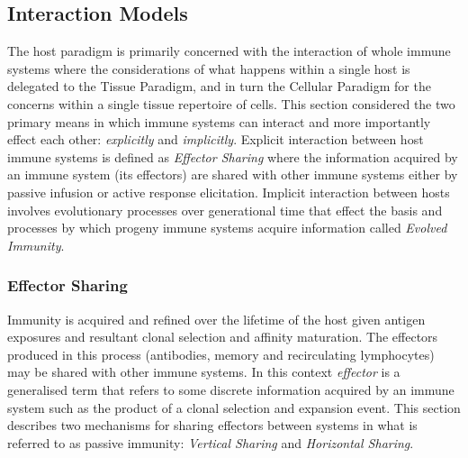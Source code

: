 \subsection{Interaction Models}
\label{sec:hosts:paradigm:interaction}
The host paradigm is primarily concerned with the interaction of whole immune systems where the considerations of what happens within a single host is delegated to the Tissue Paradigm, and in turn the Cellular Paradigm for the concerns within a single tissue repertoire of cells. This section considered the two primary means in which immune systems can interact and more importantly effect each other: \emph{explicitly} and \emph{implicitly}. Explicit interaction between host immune systems is defined as \emph{Effector Sharing} where the information acquired by an immune system (its effectors) are shared with other immune systems either by passive infusion or active response elicitation. Implicit interaction between hosts involves evolutionary processes over generational time that effect the basis and processes by which progeny immune systems acquire information called \emph{Evolved Immunity}.

%
%
\subsubsection{Effector Sharing}
\label{sec:hosts:paradigm:interaction:sharing}
Immunity is acquired and refined over the lifetime of the host given antigen exposures and resultant clonal selection and affinity maturation. The effectors produced in this process (antibodies, memory and recirculating lymphocytes) may be shared with other immune systems. In this context \emph{effector} is a generalised term that refers to some discrete information acquired by an immune system such as the product of a clonal selection and expansion event. This section describes two mechanisms for sharing effectors between systems in what is referred to as passive immunity: \emph{Vertical Sharing} and \emph{Horizontal Sharing}. 



